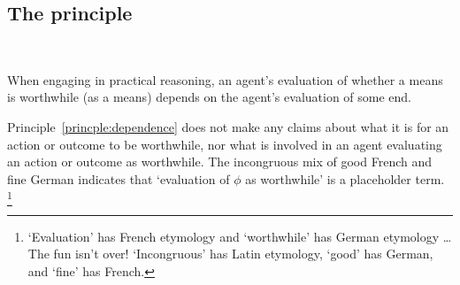 \documentclass[10pt]{article}
\newcommand{\hozline}[0]{%
  \noindent\hdashrule[0.5ex][c]{\textwidth}{.1pt}{}
}
\begin{document}
\hozline

\newpage

\subsection*{The principle}\mbox{ }

\begin{principle}\label{princple:dependence}
  When engaging in practical reasoning, an agent's evaluation of whether a means is worthwhile (as a means) depends on the agent's evaluation of some end.
\end{principle}

Principle~\ref{princple:dependence} does not make any claims about what it is for an action or outcome to be worthwhile, nor what is involved in an agent evaluating an action or outcome as worthwhile.
The incongruous mix of good French and fine German indicates that `evaluation of \(\phi\) as worthwhile' is a placeholder term.\nolinebreak
\footnote{`Evaluation' has French etymology and `worthwhile' has German etymology \dots
  The fun isn't over!
  `Incongruous' has Latin etymology, `good' has German, and `fine' has French.}
\end{document}

